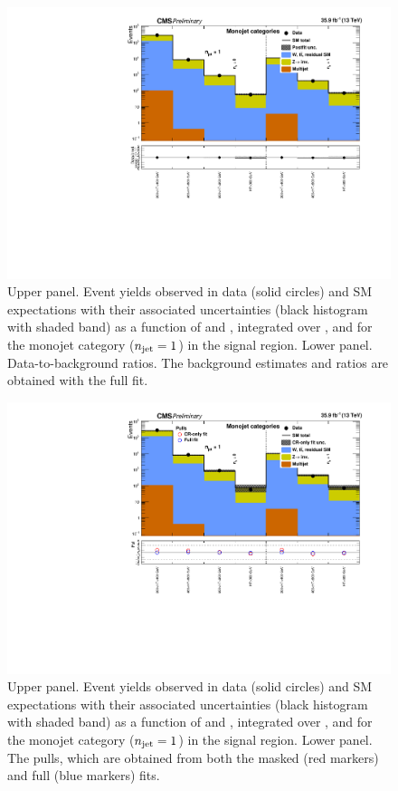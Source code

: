\clearpage
\begin{figure}[h!]
  \centering
  \caption{Upper panel. Event yields observed in data (solid circles)
    and SM expectations with their associated uncertainties (black
    histogram with shaded band) as a function of \nb and \scalht,
    integrated over \mht, and for the monojet category ($n_{\text{jet}} = 1$)
    in the signal region. Lower panel. Data-to-background ratios. The
    background estimates and ratios are obtained with the full fit. }
  \label{fig:mr_mono_post}
  \includegraphics[width=1.\linewidth]{figures/results/36invfb_freeze/mono/summaryPlot_Monojet_fit_b}
\end{figure}

\clearpage
\begin{figure}[h!]
  \centering
  \caption{Upper panel. Event yields observed in data (solid circles)
    and SM expectations with their associated uncertainties (black
    histogram with shaded band) as a function of \nb and \scalht,
    integrated over \mht, and for the monojet category ($n_{\text{jet}} = 1$)
    in the signal region. Lower panel. The pulls, which are obtained
    from both the masked (red markers) and full (blue markers) fits. }
  \label{fig:mr_mono_pulls}
  \includegraphics[width=1.\linewidth]{figures/results/36invfb_freeze/mono/summaryPlot_Monojet_prefit_overlay_fit_b}
\end{figure}

